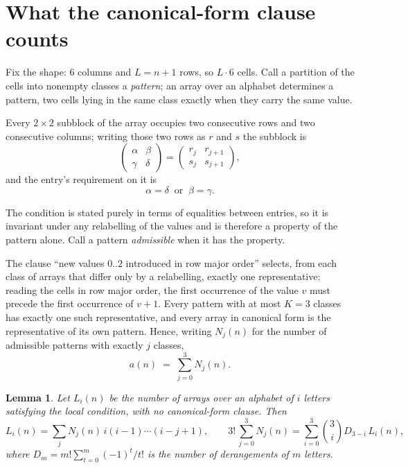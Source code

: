 \documentclass[11pt,a4paper]{article}
\theoremstyle{plain}
\newtheorem{lemma}[theorem]{Lemma}
\theoremstyle{definition}
\begin{document}
\section{What the canonical-form clause counts}

Fix the shape: $6$ columns and $L=n+1$ rows, so $L\cdot6$ cells. Call a
partition of the cells into nonempty classes a \emph{pattern}; an array over an alphabet
determines a pattern, two cells lying in the same class exactly when they carry the same
value.

Every $2\times2$ subblock of the array occupies two consecutive
rows and two consecutive columns; writing those two rows as $r$ and $s$ the
subblock is
\[
\begin{pmatrix}\alpha&\beta\\\gamma&\delta\end{pmatrix}=\begin{pmatrix}r_j&r_{j+1}\\s_j&s_{j+1}\end{pmatrix},
\]
and the entry's requirement on it is
\begin{equation}\label{eq:loc}
\alpha=\delta\ \text{ or }\ \beta=\gamma.
\end{equation}

The condition is stated purely in terms of equalities between entries, so it is invariant
under any relabelling of the values and is therefore a property of the pattern alone. Call a
pattern \emph{admissible} when it has the property.

The clause ``new values $0..2$ introduced in row major order'' selects, from each class
of arrays that differ only by a relabelling, exactly one representative: reading the cells in
row major order, the first occurrence of the value $v$ must precede the first occurrence of
$v+1$. Every pattern with at most $K=3$ classes has exactly one such representative, and
every array in canonical form is the representative of its own pattern. Hence, writing
$N_j(n)$ for the number of admissible patterns with exactly $j$ classes,
\begin{equation}\label{eq:apat}
a(n)\;=\;\sum_{j=0}^{3}N_j(n).
\end{equation}

\begin{lemma}\label{lem:inv}
Let $L_i(n)$ be the number of arrays over an alphabet of $i$ letters satisfying the local
condition, with no canonical-form clause. Then
\[
L_i(n)=\sum_j N_j(n)\,i(i-1)\cdots(i-j+1),
\qquad
3!\,\sum_{j=0}^{3}N_j(n)=\sum_{i=0}^{3}\binom{3}{i}D_{3-i}\,L_i(n),
\]
where $D_m=m!\sum_{t=0}^{m}(-1)^t/t!$ is the number of derangements of $m$ letters.
\end{lemma}
\end{document}
